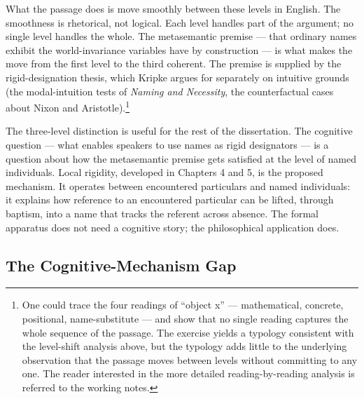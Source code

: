 \documentclass[10pt]{article}
\begin{document}
What the passage does is move smoothly between these levels in English. The smoothness is rhetorical, not logical. Each level handles part of the argument; no single level handles the whole. The metasemantic premise --- that ordinary names exhibit the world-invariance variables have by construction --- is what makes the move from the first level to the third coherent. The premise is supplied by the rigid-designation thesis, which Kripke argues for separately on intuitive grounds (the modal-intuition tests of \emph{Naming and Necessity}, the counterfactual cases about Nixon and Aristotle).\footnote{One could trace the four readings of ``object x'' --- mathematical, concrete, positional, name-substitute --- and show that no single reading captures the whole sequence of the passage. The exercise yields a typology consistent with the level-shift analysis above, but the typology adds little to the underlying observation that the passage moves between levels without committing to any one. The reader interested in the more detailed reading-by-reading analysis is referred to the working notes.}

The three-level distinction is useful for the rest of the dissertation. The cognitive question --- what enables speakers to use names as rigid designators --- is a question about how the metasemantic premise gets satisfied at the level of named individuals. Local rigidity, developed in Chapters 4 and 5, is the proposed mechanism. It operates between encountered particulars and named individuals: it explains how reference to an encountered particular can be lifted, through baptism, into a name that tracks the referent across absence. The formal apparatus does not need a cognitive story; the philosophical application does.

\subsection{The Cognitive-Mechanism Gap}\label{the-cognitive-mechanism-gap}
\end{document}
